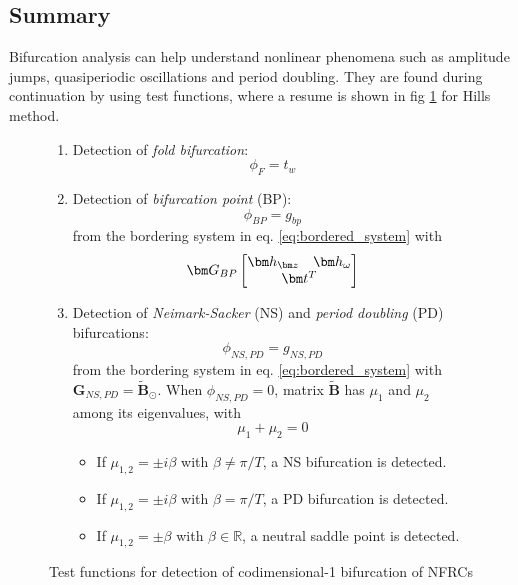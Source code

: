 \subsection{Summary}
\label{sec:bif_summary}

Bifurcation analysis can help understand nonlinear phenomena such as amplitude
jumps, quasiperiodic oscillations and period doubling. They are found during
continuation by using test functions, where a resume is shown in fig
\ref{fig:bif_scheme} for Hills method.

\begin{figure}[ht!]
  \centering
 \begin{mdframed}
    \begin{enumerate}
    \item Detection of \textit{fold bifurcation}:\\
      \begin{equation*}
        \phi_F = t_{w}
      \end{equation*}
    \item Detection of \textit{bifurcation point} (BP):\\
      \begin{equation*}
        \phi_{BP} = g_{bp}
      \end{equation*}
      from the bordering system in eq. \ref{eq:bordered_system} with
      \begin{equation*}
        \bm G_{BP}
        \begin{bmatrix}
          \bm h_{\bm z} & \bm h_{\omega} \\
          \multicolumn{2}{c}{\bm t^T}
        \end{bmatrix}
      \end{equation*}
    \item Detection of \textit{Neimark-Sacker} (NS) and \textit{period doubling}
      (PD) bifurcations:\\
      \begin{equation*}
        \phi_{NS,PD} = g_{NS,PD}
      \end{equation*}
      from the bordering system in eq. \ref{eq:bordered_system} with $\bm
      G_{NS,PD} = \tilde{\bm B}_\odot$. When $\phi_{NS,PD} = 0$, matrix
      $\tilde{\bm B}$ has $\mu_1$ and $\mu_2$ among its eigenvalues, with
      \begin{equation*}
        \mu_1 + \mu_2 = 0
      \end{equation*}
      \begin{itemize}
      \item If $\mu_{1,2}=\pm i\beta$ with $\beta \neq \pi/T$, a NS
        bifurcation is detected.
      \item If $\mu_{1,2}=\pm i\beta$ with $\beta = \pi/T$, a PD bifurcation is
        detected.
       \item If $\mu_{1,2}=\pm \beta$ with $\beta \in \mathbb{R}$, a neutral
         saddle point is detected.
      \end{itemize}
    \end{enumerate}
    \end{mdframed}
    \caption{Test functions for detection of codimensional-1 bifurcation of NFRCs}
    \label{fig:bif_scheme}
\end{figure}

